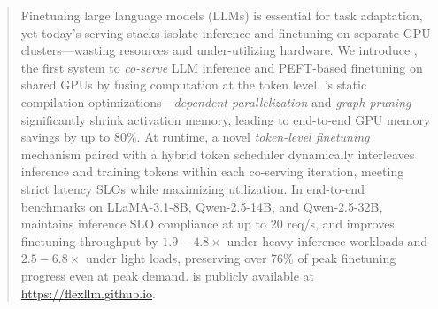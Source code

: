 \begin{abstract}
    Finetuning large language models (LLMs) is essential for task adaptation, yet today’s serving stacks isolate inference and finetuning on separate GPU clusters—wasting resources and under-utilizing hardware. We introduce \sys, the first system to {\em co-serve} LLM inference and PEFT-based finetuning on shared GPUs by fusing computation at the token level. \sys’s static compilation optimizations—{\em dependent parallelization} and {\em graph pruning} significantly shrink activation memory, leading to end-to-end GPU memory savings by up to 80\%. At runtime, a novel {\em token-level finetuning} mechanism paired with a hybrid token scheduler dynamically interleaves inference and training tokens within each co-serving iteration, meeting strict latency SLOs while maximizing utilization. In end-to-end benchmarks on LLaMA-3.1-8B, Qwen-2.5-14B, and Qwen-2.5-32B, \sys maintains inference SLO compliance at up to 20 req/s, and improves finetuning throughput by $1.9-4.8\times$ under heavy inference workloads and $2.5-6.8\times$ under light loads, preserving over 76\% of peak finetuning progress even at peak demand. \sys is publicly available at \url{https://flexllm.github.io}.
\end{abstract}
